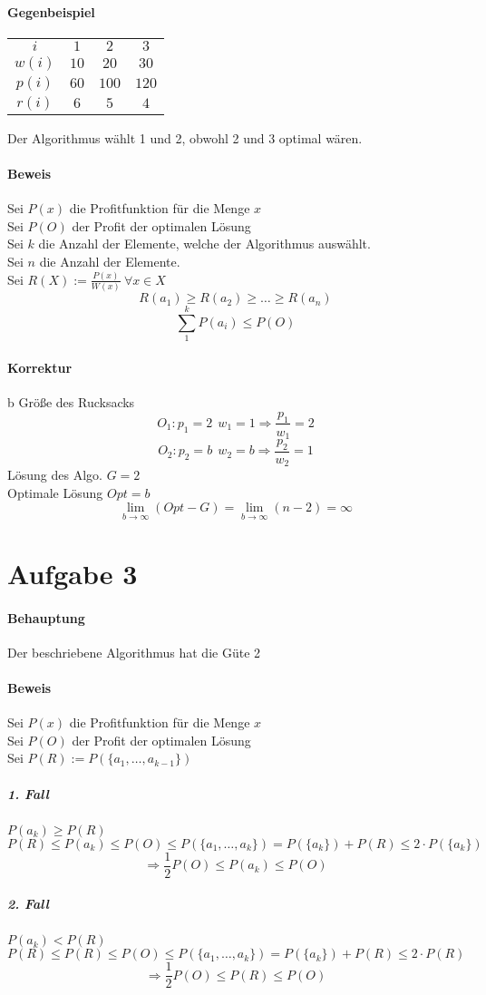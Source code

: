 \documentclass[a4paper,11pt,twoside]{article}
\begin{document}
\paragraph{Gegenbeispiel}
\begin{tabular}{c|ccc}
	$i$	&$1$&$2$&$3$\\
	$w(i)$&$10$&$20$&$30$\\
	$p(i)$&$60$&$100$&$120$\\
	$r(i)$&$6$&$5$&$4$	
\end{tabular}
Der Algorithmus wählt 1 und 2, obwohl 2 und 3 optimal wären.
\paragraph{Beweis}
Sei $P(x)$ die Profitfunktion für die Menge $x$\\
Sei $P(O)$ der Profit der optimalen Lösung\\
Sei $k$ die Anzahl der Elemente, welche der Algorithmus auswählt.\\
Sei $n$ die Anzahl der Elemente. \\
Sei $R(X) := \frac{P(x)}{W(x)}~\forall x\in X$
\[ R(a_1)\geq R(a_2) \geq \ldots \geq R(a_n) \]
\[ \sum_{1}^{k} P(a_i) \leq P(O) \] 

\paragraph{Korrektur}
	b Größe des Rucksacks
	\[ O_1: p_1 = 2~~w_1=1\Rightarrow \frac{p_1}{w_1} = 2 \]
	\[ O_2: p_2 = b~~w_2=b\Rightarrow\frac{p_2}{w_2} = 1 \]
	Lösung des Algo. $G=2$\\
	Optimale Lösung $Opt=b$\\
	\[ \lim_{b\rightarrow\infty}(Opt-G) = \lim\limits_{b \rightarrow\infty}(n-2)=\infty \]
\section*{Aufgabe 3}
\paragraph{Behauptung}
Der beschriebene Algorithmus hat die Güte 2
\paragraph{Beweis}
Sei $P(x)$ die Profitfunktion für die Menge $x$\\
Sei $P(O)$ der Profit der optimalen Lösung\\
Sei $P(R) := P(\{ a_1,\ldots,a_{k-1} \})$
\subparagraph{1. Fall} $P({a_k}) \geq P(R)$
\[ P(R) \leq P({a_k}) \leq P(O) \leq P(\{ a_1,\ldots,a_k \}) = P(\{ a_k \}) + P(R) \leq 2\cdot P(\{ a_k \}) \]
\[ \Rightarrow \frac{1}{2}P(O) \leq P({a_k}) \leq P(O) \]
\subparagraph{2. Fall} $P({a_k}) < P(R)$
\[ P(R) \leq P({R}) \leq P(O) \leq P(\{ a_1,\ldots,a_k \}) = P(\{ a_k \}) + P(R) \leq 2\cdot P(R) \]
\[ \Rightarrow \frac{1}{2}P(O) \leq P(R) \leq P(O) \]
\end{document}
